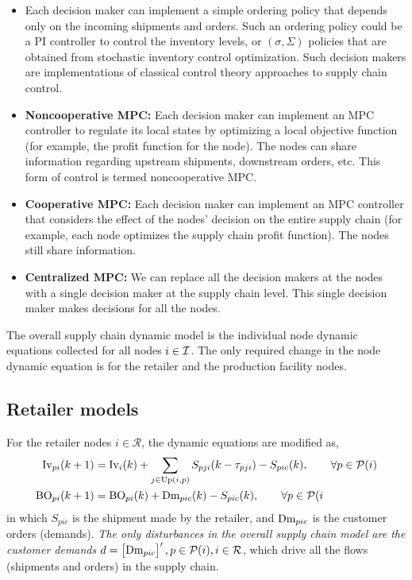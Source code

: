 \begin{itemize}
\item Each decision maker can implement a simple ordering policy that
  depends only on the incoming shipments and orders. Such an ordering
  policy could be a PI controller to control the inventory levels, or
  $(\sigma,\Sigma)$ policies that are obtained from stochastic inventory
  control optimization. Such decision makers are implementations of
  classical control theory approaches to supply chain control.

\item {\textbf{Noncooperative MPC:}} Each decision maker can implement
  an MPC controller to regulate 
  its local states by optimizing a local objective function (for
  example, the profit function for the node). The nodes 
  can share information regarding upstream shipments,
  downstream orders, etc. This form of control is termed
  noncooperative MPC. 

\item {\textbf{Cooperative MPC:}} Each decision maker can implement an
  MPC controller  that 
  considers the effect of the nodes' decision on the entire supply chain
(for example, each node optimizes the supply chain profit
function). The nodes  still share information.

\item {\textbf{Centralized MPC:}} We can replace all the decision
  makers at the nodes with a 
  single decision maker at the supply chain level. This single
  decision maker  makes  decisions for all the nodes.
\end{itemize}  

The overall supply chain dynamic model is the individual node dynamic
equations  collected for all nodes $i \in \mathcal{I}$. The
only required change in the node dynamic equation
is for the retailer  and the production facility nodes.
\subsection*{Retailer models}
 For the retailer nodes $i \in \mathcal{R}$, the dynamic
equations are  modified as, 
\begin{align}
\textrm{Iv}_{pi}(k+1) &= \textrm{Iv}_i(k) + \sum_{j \in
  \textrm{Up}(i,p)}S_{pji}(k-\tau_{pji}) - S_{pic}(k), \qquad \forall p \in \mathcal{P}(i)\\
\textrm{BO}_{pi}(k+1) &= \textrm{BO}_{pi}(k) + \textrm{Dm}_{pic}(k)- S_{pic}(k),\qquad \forall p \in \mathcal{P}(i
\end{align}
in which $S_{pic}$ is the shipment made by the retailer, and
$\textrm{Dm}_{pic}$ is the customer orders (demands).  \textit{The only disturbances in
the overall supply chain model are the customer demands} $d
= \begin{bmatrix} \textrm{Dm}_{pic} \end{bmatrix}', p \in \mathcal{P}(i), i \in \mathcal{R}$, which
drive all the flows (shipments and orders) in the supply chain. 

